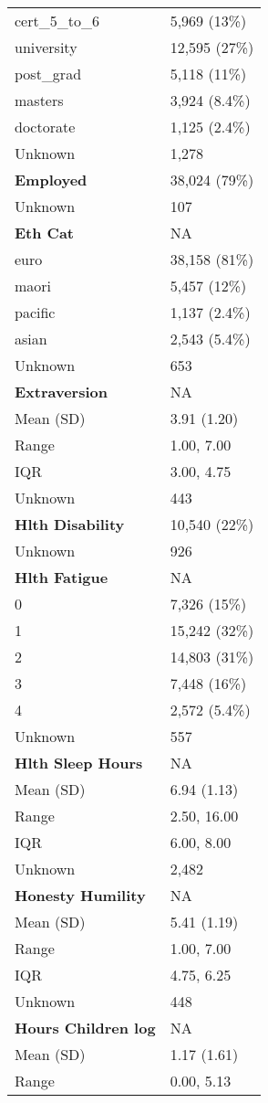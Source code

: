 \documentclass[
  single column]{article}
\begin{document}
\begin{longtable}[]{@{}ll@{}}
cert\_5\_to\_6 & 5,969 (13\%) \\
university & 12,595 (27\%) \\
post\_grad & 5,118 (11\%) \\
masters & 3,924 (8.4\%) \\
doctorate & 1,125 (2.4\%) \\
Unknown & 1,278 \\
\textbf{Employed} & 38,024 (79\%) \\
Unknown & 107 \\
\textbf{Eth Cat} & NA \\
euro & 38,158 (81\%) \\
maori & 5,457 (12\%) \\
pacific & 1,137 (2.4\%) \\
asian & 2,543 (5.4\%) \\
Unknown & 653 \\
\textbf{Extraversion} & NA \\
Mean (SD) & 3.91 (1.20) \\
Range & 1.00, 7.00 \\
IQR & 3.00, 4.75 \\
Unknown & 443 \\
\textbf{Hlth Disability} & 10,540 (22\%) \\
Unknown & 926 \\
\textbf{Hlth Fatigue} & NA \\
0 & 7,326 (15\%) \\
1 & 15,242 (32\%) \\
2 & 14,803 (31\%) \\
3 & 7,448 (16\%) \\
4 & 2,572 (5.4\%) \\
Unknown & 557 \\
\textbf{Hlth Sleep Hours} & NA \\
Mean (SD) & 6.94 (1.13) \\
Range & 2.50, 16.00 \\
IQR & 6.00, 8.00 \\
Unknown & 2,482 \\
\textbf{Honesty Humility} & NA \\
Mean (SD) & 5.41 (1.19) \\
Range & 1.00, 7.00 \\
IQR & 4.75, 6.25 \\
Unknown & 448 \\
\textbf{Hours Children log} & NA \\
Mean (SD) & 1.17 (1.61) \\
Range & 0.00, 5.13 \\

\end{longtable}
\end{document}
